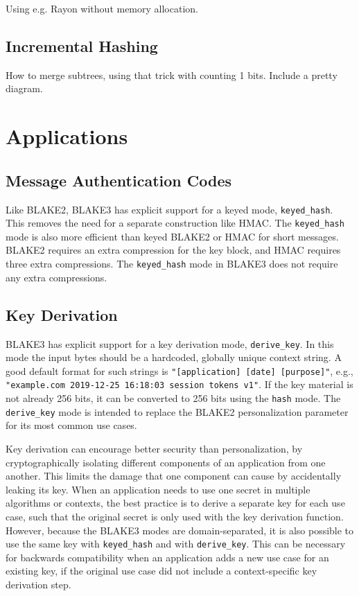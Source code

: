 \documentclass[11pt,notitlepage,a4paper]{article}
\begin{document}
Using e.g. Rayon without memory allocation.

\subsection{Incremental Hashing}\label{sec:incremental}

How to merge subtrees, using that trick with counting 1 bits. Include a pretty
diagram.

\section{Applications}\label{sec:applications}

\subsection{Message Authentication Codes}\label{sec:mac}

Like BLAKE2, BLAKE3 has explicit support for a keyed mode,
\texttt{keyed\_hash}. This removes the need for a separate construction like
HMAC. The \texttt{keyed\_hash} mode is also more efficient than keyed BLAKE2 or
HMAC for short messages. BLAKE2 requires an extra compression for the key
block, and HMAC requires three extra compressions. The \texttt{keyed\_hash}
mode in BLAKE3 does not require any extra compressions.

\subsection{Key Derivation}\label{sec:kdf}

BLAKE3 has explicit support for a key derivation mode, \texttt{derive\_key}. In
this mode the input bytes should be a hardcoded, globally unique context
string. A good default format for such strings is \texttt{"[application] [date]
[purpose]"}, e.g., \texttt{"example.com 2019-12-25 16:18:03 session tokens
v1"}. If the key material is not already 256 bits, it can be converted to 256
bits using the \texttt{hash} mode. The \texttt{derive\_key} mode is intended to
replace the BLAKE2 personalization parameter for its most common use cases.

Key derivation can encourage better security than personalization, by
cryptographically isolating different components of an application from one
another. This limits the damage that one component can cause by accidentally
leaking its key. When an application needs to use one secret in multiple
algorithms or contexts, the best practice is to derive a separate key for each
use case, such that the original secret is only used with the key derivation
function. However, because the BLAKE3 modes are domain-separated, it is also
possible to use the same key with \texttt{keyed\_hash} and with
\texttt{derive\_key}. This can be necessary for backwards compatibility when an
application adds a new use case for an existing key, if the original use case
did not include a context-specific key derivation step.
\end{document}
